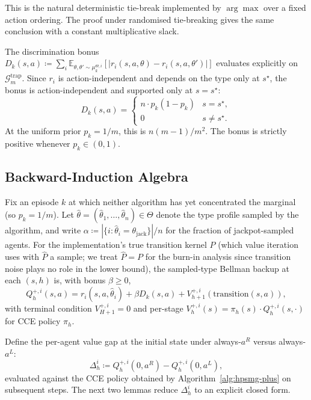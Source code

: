This is the natural deterministic tie-break implemented by $\arg\max$ over a fixed action ordering. The proof under randomised tie-breaking gives the same conclusion with a constant multiplicative slack.

The discrimination bonus $D_k(s, a) \coloneqq \sum_i \mathbb{E}_{\theta, \theta' \sim \mu_k^{\Theta, i}}[|r_i(s, a, \theta) - r_i(s, a, \theta')|]$ evaluates explicitly on $\mathcal{G}_m^{\mathrm{trap}}$. Since $r_i$ is action-independent and depends on the type only at $s^\star$, the bonus is action-independent and supported only at $s = s^\star$:
\begin{equation}
\label{eq:Dk-trap}
D_k(s, a) = \begin{cases} n \cdot p_k(1 - p_k) & s = s^\star, \\ 0 & s \neq s^\star. \end{cases}
\end{equation}
At the uniform prior $p_k = 1/m$, this is $n(m-1)/m^2$. The bonus is strictly positive whenever $p_k \in (0, 1)$.

\subsection{Backward-Induction Algebra}
\label{app:hpsmg-plus-backward}

Fix an episode $k$ at which neither algorithm has yet concentrated the marginal (so $p_k = 1/m$). Let $\hat\theta = (\hat\theta_1, \ldots, \hat\theta_n) \in \Theta$ denote the type profile sampled by the algorithm, and write $\alpha \coloneqq |\{i : \hat\theta_i = \theta_{\mathrm{jack}}\}|/n$ for the fraction of jackpot-sampled agents. For the implementation's true transition kernel $P$ (which value iteration uses with $\hat P$ a sample; we treat $\hat P = P$ for the burn-in analysis since transition noise plays no role in the lower bound), the sampled-type Bellman backup at each $(s, h)$ is, with bonus $\beta \geq 0$,
\begin{equation}
\label{eq:bellman-plus}
Q^{+, i}_h(s, a) = r_i(s, a, \hat\theta_i) + \beta D_k(s, a) + V^{+, i}_{h+1}(\mathrm{transition}(s, a)),
\end{equation}
with terminal condition $V^{+, i}_{H+1} = 0$ and per-stage $V^{+, i}_h(s) = \pi_h(s) \cdot Q^{+, i}_h(s, \cdot)$ for CCE policy $\pi_h$.

Define the per-agent value gap at the initial state under always-$a^R$ versus always-$a^L$:
\begin{equation}
\Delta^i_h \coloneqq Q^{+, i}_h(0, a^R) - Q^{+, i}_h(0, a^L),
\end{equation}
evaluated against the CCE policy obtained by Algorithm~\ref{alg:hpsmg-plus} on subsequent steps. The next two lemmas reduce $\Delta^i_h$ to an explicit closed form.

